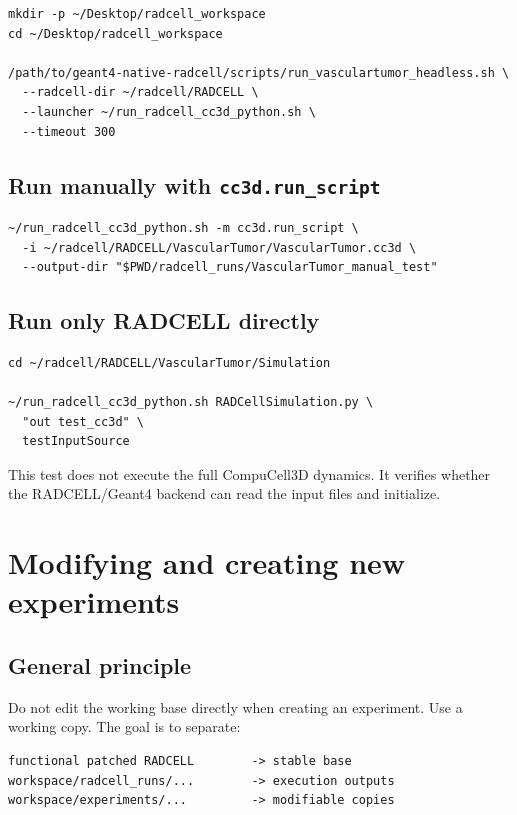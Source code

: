 \documentclass[11pt,a4paper,twoside,pdftex]{refrep}
\begin{document}
\begin{lstlisting}
mkdir -p ~/Desktop/radcell_workspace
cd ~/Desktop/radcell_workspace

/path/to/geant4-native-radcell/scripts/run_vasculartumor_headless.sh \
  --radcell-dir ~/radcell/RADCELL \
  --launcher ~/run_radcell_cc3d_python.sh \
  --timeout 300
\end{lstlisting}

\section{Run manually with \texttt{cc3d.run\_script}}

\begin{lstlisting}
~/run_radcell_cc3d_python.sh -m cc3d.run_script \
  -i ~/radcell/RADCELL/VascularTumor/VascularTumor.cc3d \
  --output-dir "$PWD/radcell_runs/VascularTumor_manual_test"
\end{lstlisting}

\section{Run only RADCELL directly}

\begin{lstlisting}
cd ~/radcell/RADCELL/VascularTumor/Simulation

~/run_radcell_cc3d_python.sh RADCellSimulation.py \
  "out test_cc3d" \
  testInputSource
\end{lstlisting}

This test does not execute the full CompuCell3D dynamics. It verifies whether the RADCELL/Geant4 backend can read the input files and initialize.

\chapter{Modifying and creating new experiments}

\section{General principle}

Do not edit the working base directly when creating an experiment. Use a working copy. The goal is to separate:

\begin{lstlisting}
functional patched RADCELL        -> stable base
workspace/radcell_runs/...        -> execution outputs
workspace/experiments/...         -> modifiable copies
\end{lstlisting}
\end{document}
